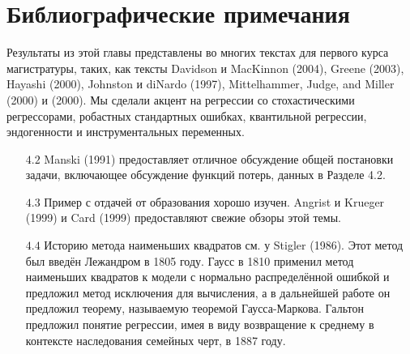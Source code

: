 \section{Библиографические примечания}

Результаты из этой главы представлены во многих текстах для первого курса магистратуры, таких, как тексты Davidson и MacKinnon (2004), Greene (2003), Hayashi (2000), Johnston и diNardo
(1997), Mittelhammer, Judge, and Miller (2000) и (2000). Мы сделали акцент на регрессии со стохастическими регрессорами, робастных стандартных ошибках, квантильной регрессии, эндогенности и инструментальных переменных.

\begin{itemize}
\item [$4.2$] Manski (1991) предоставляет отличное обсуждение общей постановки задачи, включающее обсуждение функций потерь, данных в Разделе 4.2.
\item [$4.3$] Пример с отдачей от образования хорошо изучен. Angrist и Krueger (1999) и Card
(1999) предоставляют свежие обзоры этой темы.
\item [$4.4$] Историю метода наименьших квадратов см. у Stigler (1986). Этот метод был введён Лежандром в 1805 году. Гаусс в 1810 применил метод наименьших квадратов к модели с нормально распределённой ошибкой и предложил метод исключения для вычисления, а в дальнейшей работе он предложил теорему, называемую теоремой Гаусса-Маркова. Гальтон предложил понятие регрессии, имея в виду возвращение к среднему в контексте наследования семейных черт, в 1887 году. 


\end{itemize}
